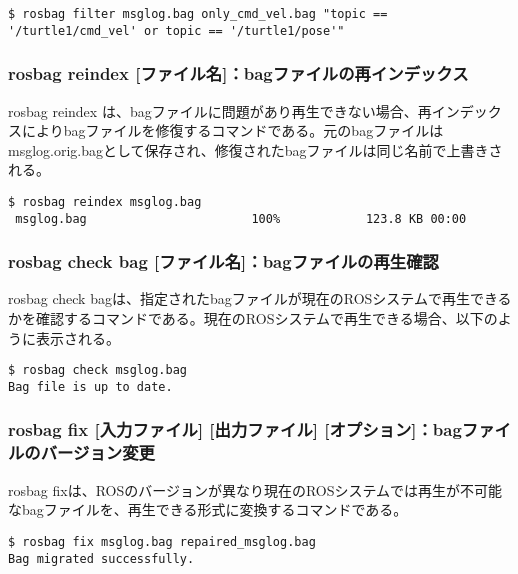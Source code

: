 \begin{lstlisting}[language=ROS]
$ rosbag filter msglog.bag only_cmd_vel.bag "topic == '/turtle1/cmd_vel' or topic == '/turtle1/pose'"
\end{lstlisting}

\subsubsection{rosbag reindex [ファイル名]：bagファイルの再インデックス}

rosbag reindex は、bagファイルに問題があり再生できない場合、再インデックスによりbagファイルを修復するコマンドである。元のbagファイルはmsglog.orig.bagとして保存され、修復されたbagファイルは同じ名前で上書きされる。

\begin{lstlisting}[language=ROS]
$ rosbag reindex msglog.bag
 msglog.bag                       100%            123.8 KB 00:00
\end{lstlisting}

\subsubsection{rosbag check bag [ファイル名]：bagファイルの再生確認}

rosbag check bagは、指定されたbagファイルが現在のROSシステムで再生できるかを確認するコマンドである。現在のROSシステムで再生できる場合、以下のように表示される。

\begin{lstlisting}[language=ROS]
$ rosbag check msglog.bag
Bag file is up to date.
\end{lstlisting}

\subsubsection{rosbag fix [入力ファイル] [出力ファイル] [オプション]：bagファイルのバージョン変更}

rosbag fixは、ROSのバージョンが異なり現在のROSシステムでは再生が不可能なbagファイルを、再生できる形式に変換するコマンドである。

\begin{lstlisting}[language=ROS]
$ rosbag fix msglog.bag repaired_msglog.bag
Bag migrated successfully.
\end{lstlisting}

